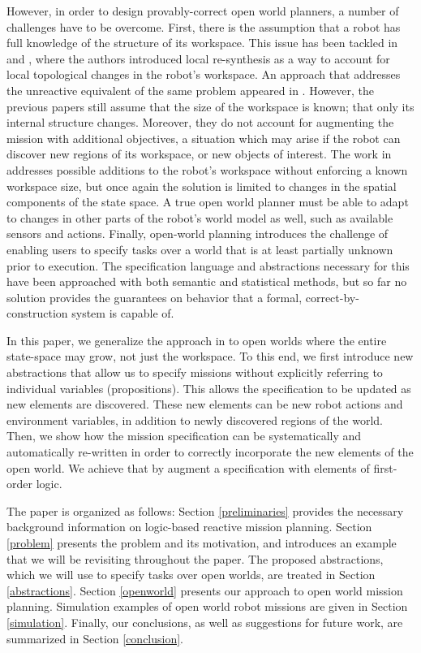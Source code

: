 However, in order to design provably-correct open world planners, a number of challenges have to be overcome. 
First, there is the assumption that a robot has full knowledge of the structure of its workspace. This issue has been tackled in \cite{MurrayICRA2012} and \cite{MurrayICRA2013a}, where the authors introduced local re-synthesis as a way to account for local topological changes in the robot's workspace. 
An approach that addresses the unreactive equivalent of the same problem appeared in \cite{Dimos2013ICRA}. 
However, the previous papers still assume that the size of the workspace is known; that only its internal structure changes. Moreover, they do not account for augmenting the mission with additional objectives, a situation which may arise if the robot can discover new regions of its workspace, or new objects of interest. 
The work in \cite{BingxinRSS2012} addresses possible additions to the robot's workspace without enforcing a known workspace size, but once again the solution is limited to changes in the spatial components of the state space. 
A true open world planner must be able to adapt to changes in other parts of the robot's world model as well, such as available sensors and actions. 
Finally, open-world planning introduces the challenge of enabling users to specify tasks over a world that is at least partially unknown prior to execution. The specification language and abstractions necessary for this have been approached with both semantic \cite{Joshi2012, Talamadupula2010} and statistical \cite{Tellex2011} methods, but so far no solution provides the guarantees on behavior that a formal, correct-by-construction system is capable of. 

In this paper, we generalize the approach in \cite{BingxinRSS2012} to open worlds where the entire state-space may grow, not just the workspace. 
To this end, we first introduce new abstractions that allow us to specify missions without explicitly referring to individual variables (propositions). This allows the specification to be updated as new elements are discovered. These new elements can be new robot actions and environment variables, in addition to newly discovered regions of the world. 
Then, we show how the mission specification can be systematically and automatically re-written in order to correctly incorporate the new elements of the open world. We achieve that by augment a specification with elements of first-order logic.

The paper is organized as follows: Section \ref{preliminaries} provides the necessary background information on logic-based reactive mission planning. Section \ref{problem} presents the problem and its motivation, and introduces an example that we will be revisiting throughout the paper. The proposed abstractions, which we will use to specify tasks over open worlds, are treated in Section \ref{abstractions}. Section \ref{openworld} presents our approach to open world mission planning. Simulation examples of open world robot missions are given in Section \ref{simulation}. Finally, our conclusions, as well as suggestions for future work, are summarized in Section \ref{conclusion}.

